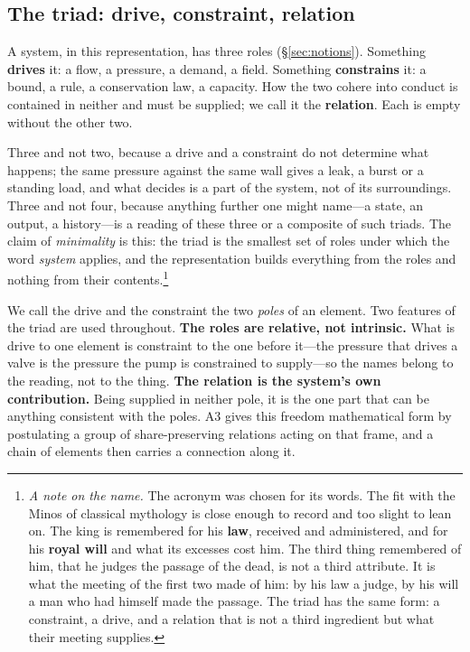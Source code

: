 \documentclass[11pt,a4paper]{article}
\theoremstyle{plain}
\theoremstyle{definition}
\theoremstyle{remark}
\begin{document}
\subsection{The triad: drive, constraint, relation}

A system, in this representation, has three roles (\S\ref{sec:notions}). Something \textbf{drives} it: a flow, a pressure, a demand, a field. Something \textbf{constrains} it: a bound, a rule, a conservation law, a capacity. How the two cohere into conduct is contained in neither and must be supplied; we call it the \textbf{relation}. Each is empty without the other two.

Three and not two, because a drive and a constraint do not determine what happens; the same pressure against the same wall gives a leak, a burst or a standing load, and what decides is a part of the system, not of its surroundings. Three and not four, because anything further one might name---a state, an output, a history---is a reading of these three or a composite of such triads. The claim of \emph{minimality} is this: the triad is the smallest set of roles under which the word \emph{system} applies, and the representation builds everything from the roles and nothing from their contents.\footnote{\emph{A note on the name.} The acronym was chosen for its words. The fit with the Minos of classical mythology is close enough to record and too slight to lean on. The king is remembered for his \textbf{law}, received and administered, and for his \textbf{royal will} and what its excesses cost him. The third thing remembered of him, that he judges the passage of the dead, is not a third attribute. It is what the meeting of the first two made of him: by his law a judge, by his will a man who had himself made the passage. The triad has the same form: a constraint, a drive, and a relation that is not a third ingredient but what their meeting supplies.}

We call the drive and the constraint the two \emph{poles} of an element. Two features of the triad are used throughout. \textbf{The roles are relative, not intrinsic.} What is drive to one element is constraint to the one before it---the pressure that drives a valve is the pressure the pump is constrained to supply---so the names belong to the reading, not to the thing. \textbf{The relation is the system's own contribution.} Being supplied in neither pole, it is the one part that can be anything consistent with the poles. A3 gives this freedom mathematical form by postulating a group of share-preserving relations acting on that frame, and a chain of elements then carries a connection along it.
\end{document}
